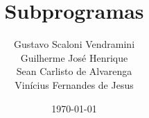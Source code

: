 \documentclass[a4paper]{article}
\title{Subprogramas}
\author{Gustavo Scaloni Vendramini    \\ 
        Guilherme José Henrique       \\
        Sean Carlisto de Alvarenga    \\
        Vinícius Fernandes de Jesus}
\date{\today}
\begin{document}
\maketitle
\pagebreak
\maketitle
\tableofcontents


\end{document}
